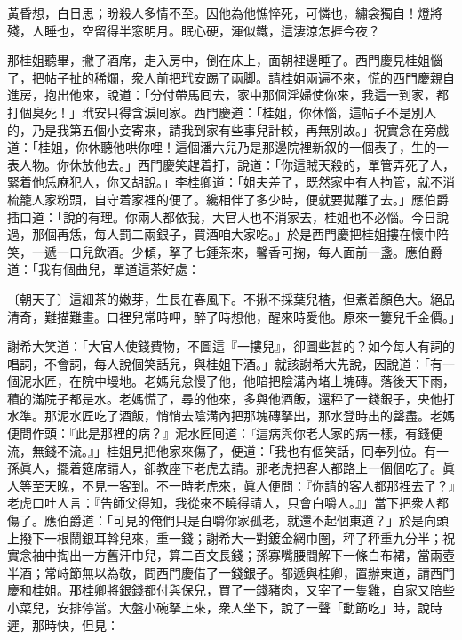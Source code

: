 \begin{myquote}[\markfont]
黃昏想，白日思；盼殺人多情不至。因他為他憔悴死，可憐也，繡衾獨自！燈將殘，人睡也，空留得半窓明月。眠心硬，渾似鐵，這淒涼怎捱今夜？

\end{myquote}

那桂姐聽畢，撇了酒席，走入房中，倒在床上，面朝裡邊睡了。{}西門慶見桂姐惱了，把帖子扯的稀爛，衆人前把玳安踢了兩脚。{}請桂姐兩遍不來，慌的西門慶親自進房，抱出他來，說道：「分付帶馬囘去，家中那個淫婦使你來，我這一到家，都打個臭死！」玳安只得含淚囘家。西門慶道：「桂姐，你休惱，這帖子不是別人的，乃是我第五個小妾寄來，請我到家有些事兒計較，再無別故。」祝實念在旁戲道：「桂姐，你休聽他哄你哩！這個潘六兒乃是那邊院裡新叙的一個表子，生的一表人物。你休放他去。」西門慶笑趕着打，說道：「你這賊天殺的，單管弄死了人，緊着他恁麻犯人，你又胡說。」{}李桂卿道：「姐夫差了，既然家中有人拘管，就不消梳籠人家粉頭，自守着家裡的便了。{}纔相伴了多少時，便就要拋離了去。」{}應伯爵插口道：「說的有理。你兩人都依我，大官人也不消家去，桂姐也不必惱。今日說過，那個再恁，每人罰二兩銀子，買酒咱大家吃。」於是西門慶把桂姐摟在懷中陪笑，一遞一口兒飲酒。少傾，拏了七鍾茶來，馨香可掬，每人面前一盞。應伯爵道：「我有個曲兒，單道這茶好處：

\begin{myquote}
{\markfont〔朝天子〕}這細茶的嫩芽，生長在春風下。不揪不採葉兒楂，但煮着顏色大。絕品清奇，難描難畫。口裡兒常時呷，醉了時想他，醒來時愛他。{}原來一簍兒千金價。」
\end{myquote}

謝希大笑道：「大官人使錢費物，不圖這『一摟兒』，{}卻圖些甚的？如今每人有詞的唱詞，不會詞，每人說個笑話兒，與桂姐下酒。」就該謝希大先說，因說道：「有一個泥水匠，在院中墁地。老媽兒怠慢了他，他暗把陰溝內堵上塊磚。落後天下雨，積的滿院子都是水。老媽慌了，尋的他來，多與他酒飯，還秤了一錢銀子，央他打水準。那泥水匠吃了酒飯，悄悄去陰溝內把那塊磚拏出，那水登時出的罄盡。老媽便問作頭：『此是那裡的病？』泥水匠囘道：『這病與你老人家的病一樣，有錢便流，無錢不流。』」桂姐見把他家來傷了，便道：「我也有個笑話，囘奉列位。有一孫眞人，擺着筵席請人，卻教座下老虎去請。那老虎把客人都路上一個個吃了。眞人等至天晚，不見一客到。不一時老虎來，眞人便問：『你請的客人都那裡去了？』老虎口吐人言：{}『告師父得知，我從來不曉得請人，只會白嚼人。』」當下把衆人都傷了。應伯爵道：「可見的俺們只是白嚼你家孤老，就還不起個東道？」於是向頭上撥下一根鬧銀耳斡兒來，重一錢；謝希大一對鍍金網巾圈，秤了秤重九分半；祝實念袖中掏出一方舊汗巾兒，算二百文長錢；{}孫寡嘴腰間解下一條白布裙，{}當兩壺半酒；常峙節無以為敬，問西門慶借了一錢銀子。都遞與桂卿，置辦東道，請西門慶和桂姐。那桂卿將銀錢都付與保兒，買了一錢豬肉，又宰了一隻雞，自家又陪些小菜兒，{}安排停當。大盤小碗拏上來，衆人坐下，說了一聲「動筯吃」時，說時遲，那時快，但見：

